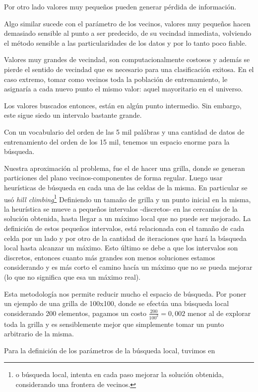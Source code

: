 Por otro lado valores muy pequeños pueden generar pérdida de información.

Algo similar sucede con el parámetro de los vecinos, valores muy
pequeños hacen demasiado sensible al punto a ser predecido, de su
vecindad inmediata, volviendo el método sensible a las
particularidades de los datos y por lo tanto poco fiable.

Valores muy grandes de vecindad, son computacionalmente costosos y
además se pierde el sentido de vecindad que es necesario para una
clasificación exitosa. En el caso extremo, tomar como vecinos toda la
población de entrenamiento, le asignaría a cada nuevo punto el mismo
valor: aquel mayoritario en el universo.

Los valores buscados entonces, están en algún punto intermedio. Sin
embargo, este sigue siedo un intervalo bastante grande.

Con un vocabulario del orden de las 5 mil palábras y una cantidad de
datos de entrenamiento del orden de los 15 mil, tenemos un espacio
enorme para la búsqueda.

Nuestra aproximación al problema, fue el de hacer una grilla, donde se
generan particiones del plano vecinos-componentes de forma
regular. Luego usar heurísticas de búsqueda en cada una de las celdas
de la misma. En particular se usó \emph{hill
  climbing}\cite{aiama}\footnote{o búsqueda local, intenta en cada paso
  mejorar la solución obtenida, considerando una frontera de vecinos.}
Definiendo un tamaño de grilla y un punto inicial en la misma, la
heurística se mueve a pequeños intervalos -discretos- en las cercanías
de la solución obtenida, hasta llegar a un máximo local que no puede
ser mejorado. La definición de estos pequeños intervalos, está
relacionada con el tamaño de cada celda por un lado y por otro de la
cantidad de iteraciones que hará la búsqueda local hasta alcanzar un
máximo. Esto último se debe a que los intervalos son discretos,
entonces cuanto más grandes son menos soluciones estamos considerando
y es más corto el camino hacía un máximo que no se pueda mejorar (lo
que no significa que esa un máximo real).

Esta metodología nos permite reducir mucho el espacio de búsqueda. Por
poner un ejemplo de una grilla de 100x100, donde se efectúa una
búsqueda local considerando 200 elementos, pagamos un costo
$\frac{200}{100^2} = 0,002$ menor al de explorar toda la grilla y es
sensiblemente mejor que simplemente tomar un punto arbitrario de la
misma.

Para la definición de los parámetros de la búsqueda local, tuvimos en


